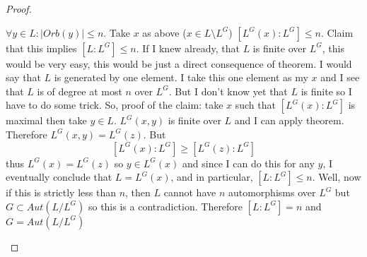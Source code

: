 \begin{theorem}[Artin]
\begin{proof}
\begin{enumerate}
      $\forall y \in L: \left|Orb\left(y\right)\right| \le n$. Take
      $x$ as above ($x \in L \setminus L^G$)
      $\left[L^G\left(x\right): L^G\right] \le n$. Claim that this
      implies $\left[L:L^G\right] \le n$. If I knew already, that $L$ is
      finite over $L^G$, this would be very easy, this would be just a
      direct consequence of  theorem. I
      would say that $L$ is generated by one element. I take this one element as
      my $x$ and I see that $L$ is of degree at most $n$ over $L^G$. But I
      don't know yet that $L$ is finite so I have to do some trick. So,
      proof of the claim:  take $x$ such that
      $\left[L^G\left(x\right):L^G\right]$ is maximal then take $y \in
      L$. $L^G\left(x,y\right)$ is finite over $L$ and I can apply
       theorem. Therefore
      $L^G\left(x,y\right) = L^G\left(z\right)$. But
      \[
      \left[L^G\left(x\right):L^G\right] \ge
      \left[L^G\left(z\right):L^G\right]
      \]
      thus $L^G\left(x\right) = L^G\left(z\right)$ so
      $y \in L^G\left(x\right)$ and since I can do this for any $y$, I
      eventually conclude that $L = L^G\left(x\right)$, and in
      particular, $\left[L: L^G\right] \le n$. Well, now if this is
      strictly less than $n$, then $L$ cannot have $n$ automorphisms
      over $L^G$ but $G \subset Aut\left(L/L^G\right)$ so this is a
      contradiction. Therefore $\left[L: L^G\right] = n$ and
      $G = Aut\left(L/L^G\right)$
    \end{enumerate}
  \end{proof}
  \label{thm:artin}
\end{theorem}
